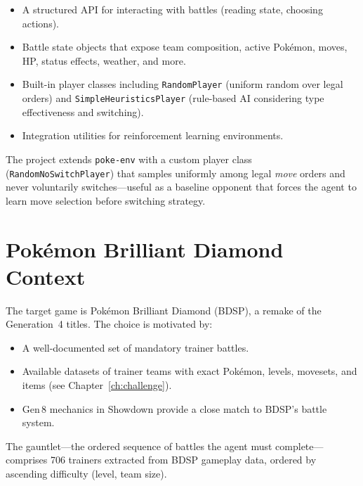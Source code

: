 \begin{itemize}
  \item A structured API for interacting with battles (reading state,
        choosing actions).
  \item Battle state objects that expose team composition, active Pok\'{e}mon,
        moves, HP, status effects, weather, and more.
  \item Built-in player classes including \texttt{RandomPlayer} (uniform
        random over legal orders) and \texttt{SimpleHeuristicsPlayer}
        (rule-based AI considering type effectiveness and switching).
  \item Integration utilities for reinforcement learning environments.
\end{itemize}

The project extends \texttt{poke-env} with a custom player class
(\texttt{RandomNoSwitchPlayer}) that samples uniformly among legal \emph{move}
orders and never voluntarily switches---useful as a baseline opponent that
forces the agent to learn move selection before switching strategy.

\section{Pok\'{e}mon Brilliant Diamond Context}

The target game is Pok\'{e}mon Brilliant Diamond (BDSP), a remake of the
Generation~4 titles.  The choice is motivated by:

\begin{itemize}
  \item A well-documented set of mandatory trainer battles.
  \item Available datasets of trainer teams with exact Pok\'{e}mon, levels,
        movesets, and items (see Chapter~\ref{ch:challenge}).
  \item Gen\,8 mechanics in Showdown provide a close match to BDSP's battle
        system.
\end{itemize}

The gauntlet---the ordered sequence of battles the agent must
complete---comprises 706 trainers extracted from BDSP gameplay data, ordered
by ascending difficulty (level, team size).
